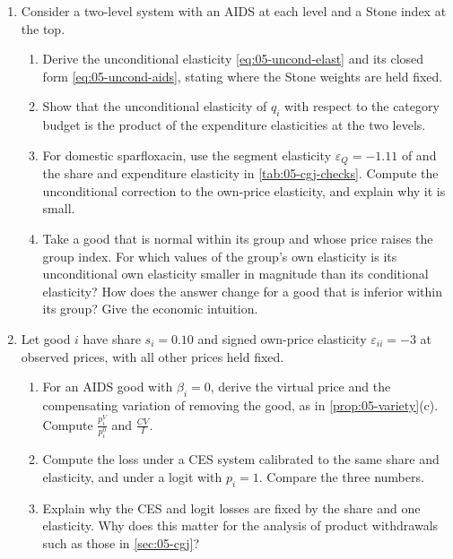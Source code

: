 \begin{enumerate}[label=\arabic*., leftmargin=*, itemsep=6pt]
\item Consider a two-level system with an AIDS at each level and a Stone index at the top.
\begin{enumerate}[label=(\alph*)]
  \item Derive the unconditional elasticity \eqref{eq:05-uncond-elast} and its closed form
  \eqref{eq:05-uncond-aids}, stating where the Stone weights are held fixed.
  \item Show that the unconditional elasticity of $q_i$ with respect to the category budget is the product of the
  expenditure elasticities at the two levels.
  \item For domestic sparfloxacin, use the segment elasticity $\varepsilon_Q = -1.11$ of
  \citet{ChaudhuriGoldbergJia2006} and the share and expenditure elasticity in \cref{tab:05-cgj-checks}. Compute
  the unconditional correction to the own-price elasticity, and explain why it is small.
  \item Take a good that is normal within its group and whose price raises the group index. For which values of
  the group's own elasticity is its unconditional own elasticity smaller in magnitude than its conditional
  elasticity? How does the answer change for a good that is inferior within its group? Give the economic
  intuition.
\end{enumerate}

\item Let good $i$ have share $s_i = 0.10$ and signed own-price elasticity $\varepsilon_{ii} = -3$ at observed
prices, with all other prices held fixed.
\begin{enumerate}[label=(\alph*)]
  \item For an AIDS good with $\beta_i = 0$, derive the virtual price and the compensating variation of removing
  the good, as in \cref{prop:05-variety}(c). Compute $\frac{p_i^V}{p_i^0}$ and $\frac{CV}{I}$.
  \item Compute the loss under a CES system calibrated to the same share and elasticity, and under a logit with
  $p_i = 1$. Compare the three numbers.
  \item Explain why the CES and logit losses are fixed by the share and one elasticity. Why does this matter for
  the analysis of product withdrawals such as those in \cref{sec:05-cgj}?
\end{enumerate}


\end{enumerate}
